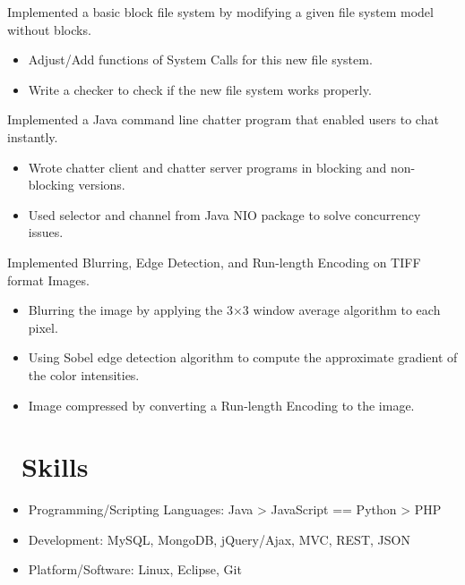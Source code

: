 \documentclass{resume}
\begin{document}

Implemented a basic block file system by modifying a given file system model without blocks.
\begin{itemize}
  \item Adjust/Add functions of System Calls for this new file system.
  \item Write a checker to check if the new file system works properly.
\end{itemize}

Implemented a Java command line chatter program that enabled users to chat instantly.
\begin{itemize}
  \item Wrote chatter client and chatter server programs in blocking and non-blocking versions.
  \item Used selector and channel from Java NIO package to solve concurrency issues.
\end{itemize}

Implemented Blurring, Edge Detection, and Run-length Encoding on TIFF format Images.
\begin{itemize}
  \item Blurring the image by applying the 3×3 window average algorithm to each pixel.
  \item Using Sobel edge detection algorithm to compute the approximate gradient of the color intensities.
  \item Image compressed by converting a Run-length Encoding to the image.
\end{itemize}

\section{\faCog\ Skills}
\begin{itemize}[parsep=0.5ex]
  \item Programming/Scripting Languages: Java > JavaScript == Python > PHP
  \item Development: MySQL, MongoDB, jQuery/Ajax, MVC, REST, JSON
  \item Platform/Software: Linux, Eclipse, Git
\end{itemize}
\end{document}

